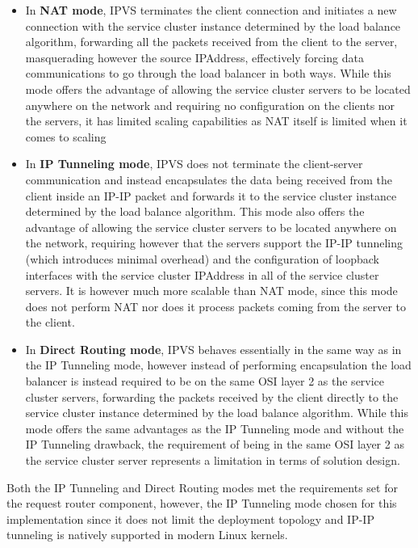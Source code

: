 \begin{itemize}
	\item In \textbf{\gls{NAT} mode}, \gls{IPVS} terminates the client connection and initiates a new connection with the service cluster instance determined by the load balance algorithm, forwarding all the packets received from the client to the server, masquerading however the source \gls{IPAddress}, effectively forcing data communications to go through the load balancer in both ways. While this mode offers the advantage of allowing the service cluster servers to be located anywhere on the network and requiring no configuration on the clients nor the servers, it has limited scaling capabilities as \gls{NAT} itself is limited when it comes to scaling
	\item In \textbf{IP Tunneling mode}, \gls{IPVS} does not terminate the client-server communication and instead encapsulates the data being received from the client inside an IP-IP packet and forwards it to the service cluster instance determined by the load balance algorithm. This mode also offers the advantage of allowing the service cluster servers to be located anywhere on the network, requiring however that the servers support the IP-IP tunneling (which introduces minimal overhead) and the configuration of loopback interfaces with the service cluster \gls{IPAddress} in all of the service cluster servers. It is however much more scalable than \gls{NAT} mode, since this mode does not perform \gls{NAT} nor does it process packets coming from the server to the client.
	\item In \textbf{Direct Routing mode}, \gls{IPVS} behaves essentially in the same way as in the IP Tunneling mode, however instead of performing encapsulation the load balancer is instead required to be on the same \gls{OSI} layer 2 as the service cluster servers, forwarding the packets received by the client directly to the service cluster instance determined by the load balance algorithm. While this mode offers the same advantages as the IP Tunneling mode and without the IP Tunneling drawback, the requirement of being in the same \gls{OSI} layer 2 as the service cluster server represents a limitation in terms of solution design.
\end{itemize}	
%
Both the IP Tunneling and Direct Routing modes met the requirements set for the request router component, however, the IP Tunneling mode chosen for this implementation since it does not limit the deployment topology and IP-IP tunneling is natively supported in modern Linux kernels.
